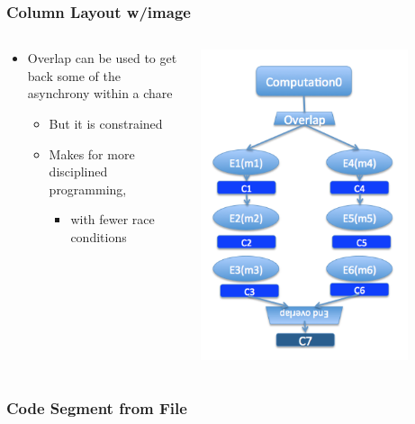 \documentclass{beamer}
\begin{document}
\begin{frame}[fragile]
  \frametitle{Column Layout w/image}

  \begin{columns}
    \begin{column}{0.6\textwidth}
      \begin{itemize}
      \item Overlap can be used to get back some of the asynchrony within a chare
        \begin{itemize}
        \item But it is constrained
        \item Makes for more disciplined programming, 
          \begin{itemize}
          \item with fewer race conditions
          \end{itemize}
        \end{itemize}
      \end{itemize}
    \end{column}
    \begin{column}{0.4\textwidth}
      \includegraphics[width=0.8\textwidth]{classSlides/diagrams/overlapFlow.png}
    \end{column}
  \end{columns}

\end{frame}

\begin{frame}[fragile]
  \frametitle{Code Segment from File}
  
\end{frame}
\end{document}
